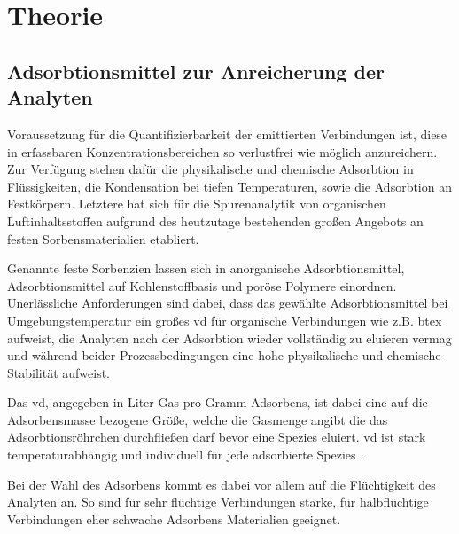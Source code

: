 \section{Theorie}\label{sec:theorie}
\subsection{Adsorbtionsmittel zur Anreicherung der Analyten}
Voraussetzung für die Quantifizierbarkeit der emittierten Verbindungen ist, diese in erfassbaren Konzentrationsbereichen so verlustfrei wie möglich anzureichern.
Zur Verfügung stehen dafür die physikalische und chemische Adsorbtion in Flüssigkeiten, die Kondensation bei tiefen Temperaturen, sowie die Adsorbtion an Festkörpern.
Letztere hat sich für die Spurenanalytik von organischen Luftinhaltsstoffen aufgrund des heutzutage bestehenden großen Angebots an festen Sorbensmaterialien etabliert. \par
Genannte feste Sorbenzien lassen sich in anorganische Adsorbtionsmittel, Adsorbtionsmittel auf Kohlenstoffbasis und poröse Polymere einordnen.
Unerlässliche Anforderungen sind dabei, dass das gewählte Adsorbtionsmittel bei Umgebungstemperatur ein großes \ac{vd} für organische Verbindungen wie z.B. \gls{btex} aufweist, die Analyten nach der Adsorbtion wieder vollständig zu eluieren vermag und während beider Prozessbedingungen eine hohe physikalische und chemische Stabilität aufweist. \par
Das \ac{vd}, angegeben in Liter Gas pro Gramm Adsorbens, ist dabei eine auf die Adsorbensmasse bezogene Größe, welche die Gasmenge angibt die das Adsorbtionsröhrchen durchfließen darf bevor eine Spezies eluiert.
\ac{vd} ist stark temperaturabhängig und individuell für jede adsorbierte Spezies \cite{figge_adsorptionsmittel_1987}. \par
Bei der Wahl des Adsorbens kommt es dabei vor allem auf die Flüchtigkeit des Analyten an.
So sind für sehr flüchtige Verbindungen starke, für halbflüchtige Verbindungen eher schwache Adsorbens Materialien geeignet.
